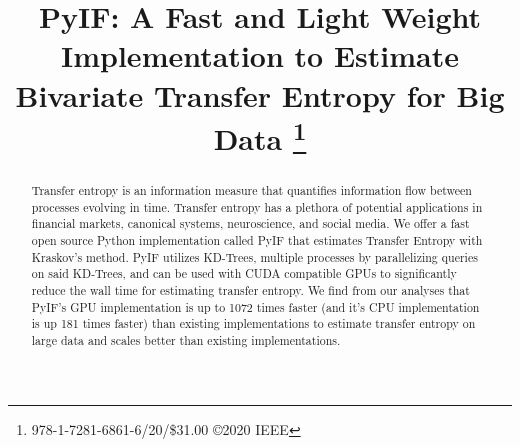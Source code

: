\documentclass[conference]{IEEEtran}
\begin{document}
\title{PyIF: A Fast and Light Weight Implementation to Estimate Bivariate Transfer Entropy for Big Data
\thanks{978-1-7281-6861-6/20/\$31.00 ©2020 IEEE}
}

\author{
\and
{}
\and
{}
\and
{}
}

\maketitle

\begin{abstract}
Transfer entropy is an information measure that quantifies information flow between processes evolving in time. Transfer entropy has a plethora of potential applications in financial markets, canonical systems, neuroscience, and social media. We offer a fast open source Python implementation called PyIF that estimates Transfer Entropy with Kraskov's method. PyIF utilizes KD-Trees, multiple processes by parallelizing queries on said KD-Trees, and can be used with CUDA compatible GPUs to significantly reduce the wall time for estimating transfer entropy. We find from our analyses that PyIF's GPU implementation is up to 1072 times faster (and it's CPU implementation is up 181 times faster) than existing implementations to estimate transfer entropy on large data and scales better than existing implementations.
\end{abstract}
\end{document}
